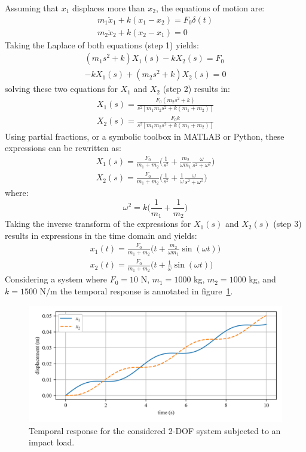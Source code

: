 \documentclass[12pt,letter]{article}
\begin{document}
\begin{example}
  Assuming that $x_1$ displaces more than $x_2$, the equations of motion are:
	\begin{eqnarray}
	m_1\ddot{x}_1 + k(x_1-x_2)  = F_0 \delta (t) \\
	m_2\ddot{x}_2 + k(x_2-x_1)  = 0  \nonumber
	\end{eqnarray}
	Taking the Laplace of both equations (step 1) yields:
	\begin{eqnarray}
	(m_1 s^2 +k)X_1(s) - k X_2(s) = F_0 \\
	-k X_1(s) + (m_2 s^2 + k) X_2(s) = 0  \nonumber
	\end{eqnarray}
	solving these two equations for $X_1$ and $X_2$ (step 2) results in:
	\begin{eqnarray}
	X_1(s) = \frac{F_0(m_2 s^2 +k)}{s^2 [m_1 m_2 s^2 + k (m_1 + m_2)]} \\
	X_2(s) = \frac{F_0 k}{s^2 [m_1 m_2 s^2 + k (m_1 + m_2)]} \nonumber
	\end{eqnarray}
	Using partial fractions, or a symbolic toolbox in MATLAB or Python, these expressions can be rewritten as:
	\begin{eqnarray}
	X_1(s) = \frac{F_0}{m_1 + m_2} \bigg( \frac{1}{s^2} + \frac{m_2}{\omega m_1} \frac{\omega}{s^2 + \omega^2} \bigg) \\
	X_2(s) = \frac{F_0}{m_1 + m_2} \bigg( \frac{1}{s^2} + \frac{1}{\omega} \frac{\omega}{s^2 + \omega^2} \bigg) \nonumber
	\end{eqnarray}
	where:
	\begin{equation}
	\omega^2 = k \bigg( \frac{1}{m_1} + \frac{1}{m_2} \bigg)
	\end{equation}
	Taking the inverse transform of the expressions for $X_1(s)$ and $X_2(s)$ (step 3) results in expressions in the time domain and yields:
	\begin{eqnarray}
	x_1(t) = \frac{F_0}{m_1 + m_2} \bigg( t + \frac{m_2}{\omega m_1} \sin (\omega t) \bigg) \\
	x_2(t) = \frac{F_0}{m_1 + m_2} \bigg( t + \frac{1}{\omega} \sin (\omega t) \bigg) \nonumber
	\end{eqnarray}
	Considering a system where $F_0=10$ N, $m_1=1000$ kg, $m_2=1000$ kg, and $k=1500$ N/m the temporal response is annotated in figure~\ref{fig:2_DOF_impact_example}. 
	
	
	\begin{figure}[H]
		\centering
		\includegraphics[width=\linewidth]{../figures/2_DOF_impact_example.png}
		\caption{Temporal response for the considered 2-DOF system subjected to an impact load.}
		\label{fig:2_DOF_impact_example}
	\end{figure}
	

\end{example}
\end{document}
